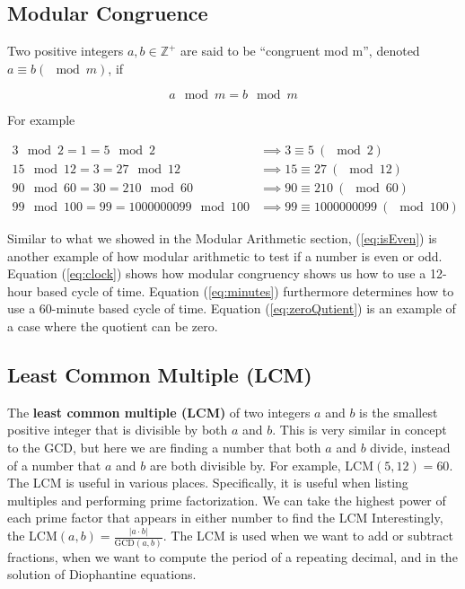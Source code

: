 \documentclass{article}
\renewcommand{\_}{\ifincsname_\else\legacyunderscore\fi}
\begin{document}
    \subsection*{Modular Congruence}    

        Two positive integers $a, b \in \mathbb{Z}^+$ are said to be ``congruent mod m'', denoted $a \equiv b (\mod m)$, if 

        \begin{equation}
            a \mod m = b \mod m
        \end{equation}

        For example

        \begin{align}
            \label{eq:isEven}      3 \mod 2 = 1 = 5 \mod 2 &\implies 3 \equiv 5 \ (\mod 2) \\
            \label{eq:clock}       15 \mod 12 = 3 = 27 \mod 12 &\implies 15 \equiv 27 \ (\mod 12) \\
            \label{eq:minutes}     90 \mod 60 = 30 = 210 \mod 60 &\implies 90 \equiv 210 \ (\mod 60) \\
            \label{eq:zeroQutient} 99 \mod 100 = 99 = 1000000099 \mod 100 &\implies 99 \equiv 1000000099 \ (\mod 100)
        \end{align}

        Similar to what we showed in the Modular Arithmetic section, (\ref{eq:isEven}) is another example of how modular arithmetic to test if a number is even or odd.  Equation (\ref{eq:clock}) shows how modular congruency shows us how to use a 12-hour based cycle of time.  Equation (\ref{eq:minutes}) furthermore determines how to use a 60-minute based cycle of time.  Equation (\ref{eq:zeroQutient}) is an example of a case where the quotient can be zero.

    \subsection*{Least Common Multiple (LCM)}
    The \textbf{least common multiple (LCM)} of two integers $a$ and $b$ is the smallest positive integer that is divisible by both $a$ and $b$. This is very similar in concept to the GCD, but here we are finding a number that both $a$ and $b$ divide, instead of a number that $a$ and $b$ are both divisible by. For example, LCM$(5, 12) = 60$. The LCM is useful in various places. Specifically, it is useful when listing multiples and performing prime factorization. We can take the highest power of each prime factor that appears in either number to find the LCM Interestingly, the LCM$(a, b)=\frac{\left|a\cdot b\right|}{\text{GCD}(a, b)}$. The LCM is used when we want to add or subtract fractions, when we want to compute the period of a repeating decimal, and in the solution of Diophantine equations. 
\end{document}

